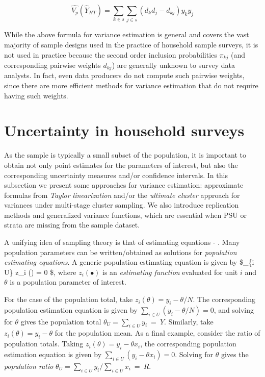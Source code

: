 \documentclass[
  12pt,
]{book}
\begin{document}
\[
\widehat {V_p} \left( \widehat{Y}_{HT} \right) = \sum_{k \in s} \sum_{j \in s} \left( d_k d_j - d_{kj} \right) y_k y_j
\]

While the above formula for variance estimation is general and covers the vast majority of sample designs used in the practice of household sample surveys, it is not used in practice because the second order inclusion probabilities \(\pi_{kj}\) (and corresponding pairwise weights \(d_{kj}\)) are generally unknown to survey data analysts. In fact, even data producers do not compute such pairwise weights, since there are more efficient methods for variance estimation that do not require having such weights.

\section{Uncertainty in household surveys}\label{uncertainty-in-household-surveys}

As the sample is typically a small subset of the population, it is important to obtain not only point estimates for the parameters of interest, but also the corresponding uncertainty measures and/or confidence intervals. In this subsection we present some approaches for variance estimation: approximate formulas from \emph{Taylor linearization} and/or the \emph{ultimate cluster} approach for variances under multi-stage cluster sampling. We also introduce replication methods and generalized variance functions, which are essential when PSU or strata are missing from the sample dataset.

A unifying idea of sampling theory is that of estimating equations - \citet{Binder1983}. Many population parameters can be written/obtained as solutions for \emph{population estimating equations}. A generic population estimating equation is given by \$\sum\_\{i \in U\} z\_i (\theta) = 0 \$, where \(z_i(\bullet)\) is an \emph{estimating function} evaluated for unit \(i\) and \(\theta\) is a population parameter of interest.

For the case of the population total, take \(z_i(\theta) = y_i - \theta / N\). The corresponding population estimation equation is given by \(\sum _{i \in U} (y_i - \theta / N) = 0\), and solving for \(\theta\) gives the population total \(\theta_U = \sum _{i \in U} y_i \ = \ Y\). Similarly, take \(z_i(\theta) = y_i - \theta\) for the population mean. As a final example, consider the ratio of population totals. Taking \(z_i(\theta) = y_i - \theta x_i\), the corresponding population estimation equation is given by \(\sum _{i \in U} (y_i - \theta x_i) = 0\). Solving for \(\theta\) gives the \emph{population ratio} \(\theta_U = \sum _{i \in U} y_i / \sum _{i \in U} x_i \ = \ R\).
\end{document}
